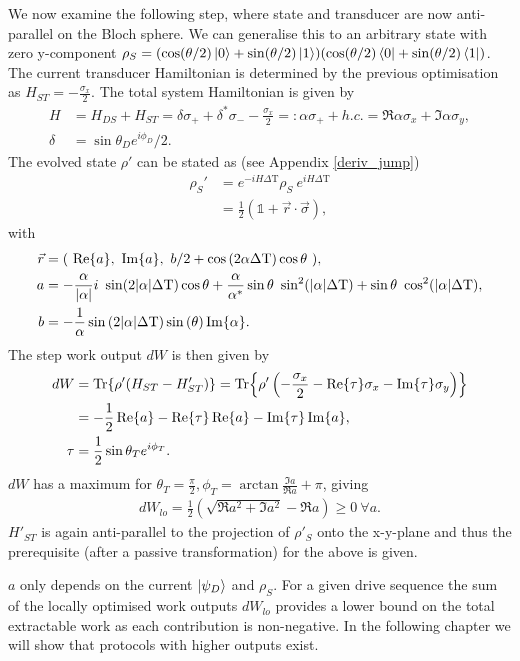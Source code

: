 We now examine the following step, where state and transducer are now anti-parallel on the Bloch sphere.
We can generalise this to an arbitrary state with zero y-component $\rho_S = (\cos(\theta/2) \ket{0} + \sin(\theta/2) \ket{1})(\cos(\theta/2) \bra{0} + \sin(\theta/2) \bra{1})$.
The current transducer Hamiltonian is determined by the previous optimisation as $H_{ST} = -\frac{\sigma_x}{2}$.
The total system Hamiltonian is given by
\begin{align*}
H &= H_{DS} + H_{ST} =  \delta \sigma_+ + \delta^* \sigma_{-} - \frac{\sigma_x}{2} =: \alpha \sigma_+ + h.c. = \Re{\alpha} \sigma_x + \Im{\alpha} \sigma_y, \\
\delta &= \sin{\theta_D} e^{i\phi_D} / 2.
\end{align*}
The evolved state $\rho'$ can be stated as (see Appendix \ref{deriv_jump})
\begin{align*}
\rho_S' &= e^{-iH\Delta \mathrm{T}} \rho_S \ e^{iH\Delta \mathrm{T}} \\
&=\frac{1}{2} (\mathds{1} + \vec{r} \cdot \vec{\sigma}),       
\end{align*}
with
\begin{align*}
\vec{r} &= ( \ \Re{a}, \ \Im{a}, \ b/2 + \cos{(2 \alpha \Delta \mathrm{T})} \cos{\theta} \ ), \\
a &= -\frac{\alpha}{\abs{\alpha}} i \ \sin(2 \abs{\alpha} \Delta \mathrm{T}) \cos{\theta} + \frac{\alpha}{\alpha^*} \sin{\theta} \ \sin^2(\abs{\alpha} \Delta \mathrm{T}) + \sin{\theta} \ \cos^2(\abs{\alpha} \Delta \mathrm{T}), \\
b &= -\frac{1}{\alpha} \sin{(2 \abs{\alpha} \Delta \mathrm{T})} \sin{(\theta)} \Im{\alpha}.
\end{align*}
The step work output $dW$ is then given by
\begin{align*}
dW &= \Tr{\rho' (H_{ST} - H'_{ST})} = \Tr{\rho' \left(-\frac{\sigma_x}{2} - \Re{\tau} \sigma_x - \Im{\tau} \sigma_y \right)} \\
&= -\frac{1}{2} \Re{a} - \Re{\tau}\Re{a} - \Im{\tau} \Im{a}, \\
\tau &= \frac{1}{2} \sin{\theta_T} e^{i\phi_T}. 
\end{align*}
$dW$ has a maximum for $\theta_T = \frac{\pi}{2}, \phi_T = \arctan{\frac{\Im{a}}{\Re{a}}} + \pi$, giving
\begin{align*}
dW_{lo} = \frac{1}{2}\left(\sqrt{\Re{a}^2 + \Im{a}^2} -\Re{a}\right) \geq 0 \ \forall a.
\end{align*}
$H'_{ST}$ is again anti-parallel to the projection of $\rho'_S$ onto the x-y-plane and thus the prerequisite (after a passive transformation) for the above is given.

$a$ only depends on the current $\ket{\psi_D}$ and $\rho_S$.
For a given drive sequence the sum of the locally optimised work outputs $dW_{lo}$ provides a lower bound on the total extractable work as each contribution is non-negative. In the following chapter we will show that protocols with higher outputs exist.